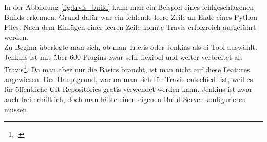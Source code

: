 In der Abbildung \ref{fig:trvis_build} kann man ein Beispiel eines fehlgeschlagenen Builds erkennen. Grund dafür war ein fehlende leere Zeile an Ende eines Python Files. Nach dem Einfügen einer leeren Zeile konnte Travis erfolgreich ausgeführt werden. \\

Zu Beginn überlegte man sich, ob man Travis oder Jenkins als \gls{ci} Tool auswählt. Jenkins ist mit über 600 Plugins zwar sehr flexibel und weiter verbreitet als Travis\footcite{travis_jenkins}. Da man aber nur die Basics braucht, ist man nicht auf diese Features angewiesen. Der Hauptgrund, warum man sich für Travis entschied, ist, weil es für öffentliche Git Repositories gratis verwendet werden kann. Jenkins ist zwar auch frei erhältlich, doch man hätte einen eigenen Build Server konfigurieren müssen. 